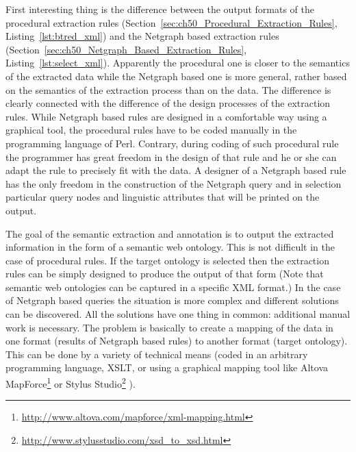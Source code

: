 First interesting thing is the difference between the output formats of the procedural extraction rules (Section~\ref{sec:ch50_Procedural_Extraction_Rules}, Listing~\ref{lst:btred_xml}) and the Netgraph based extraction rules (Section~\ref{sec:ch50_Netgraph_Based_Extraction_Rules}, Listing~\ref{lst:select_xml}). Apparently the procedural one is closer to the semantics of the extracted data while the Netgraph based one is more general, rather based on the semantics of the extraction process than on the data. The difference is clearly connected with the difference of the design processes of the extraction rules. While Netgraph based rules are designed in a comfortable way using a graphical tool, the procedural rules have to be coded manually in the programming language of Perl. Contrary, during coding of such procedural rule the programmer has great freedom in the design of that rule and he or she can adapt the rule to precisely fit with the data. A designer of a Netgraph based rule has the only freedom in the construction of the Netgraph query and in selection particular query nodes and linguistic attributes that will be printed on the output.

The goal of the semantic extraction and annotation is to output the extracted information in the form of a semantic web ontology. This is not difficult in the case of procedural rules. If the target ontology is selected then the extraction rules can be simply designed to produce the output of that form (Note that semantic web ontologies can be captured in a specific XML format.) In the case of Netgraph based queries the situation is more complex and different solutions can be discovered. All the solutions have one thing in common: additional manual work is necessary. The problem is basically to create a mapping of the data in one format (results of Netgraph based rules) to another format (target ontology). This can be done by a variety of technical means (coded in an arbitrary programming language, XSLT, or using a graphical mapping tool like 
Altova MapForce\footnote{\url{http://www.altova.com/mapforce/xml-mapping.html}}
or
Stylus Studio\footnote{\url{http://www.stylusstudio.com/xsd_to_xsd.html}}
). 



